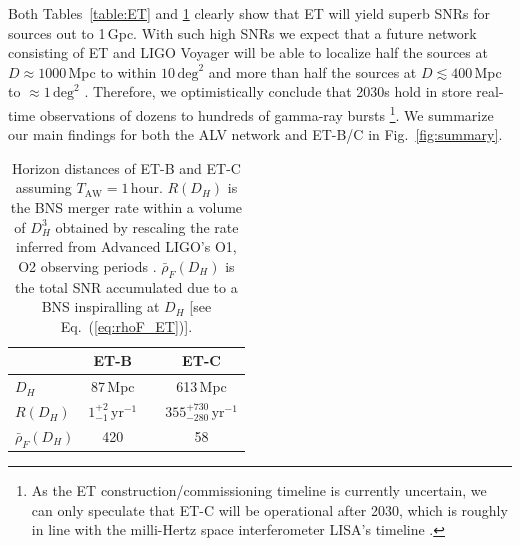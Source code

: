 \documentclass[prd,amsmath,amssymb,aps,floats,amsfonts,notitlepage,superscriptaddress,eqsecnum,nofootinbib,10pt]{revtex4-1}
\newcommand\T{\rule{0pt}{2.6ex}}       %
\newcommand\B{\rule[-1.2ex]{0pt}{0pt}} %
\begin{document}
Both Tables~\ref{table:ET} and \ref{table:horizon} clearly show that ET will yield superb SNRs for sources out to 1\,Gpc. 
With such high SNRs we expect that a future network consisting of ET and LIGO Voyager will be able to localize half the sources 
at $D\approx 1000\,$Mpc to within $ 10\,\text{deg}^2$ and more than half the sources at $D\lesssim 400\,$Mpc to $\approx 1\,\text{deg}^2$ \cite{Mills:2017urp}.
Therefore, we optimistically conclude that 2030s hold in store real-time observations of dozens to hundreds of gamma-ray bursts
\footnote{As the ET construction/commissioning timeline is currently uncertain, we can only speculate that ET-C will be operational after 2030,
which is roughly in line with the milli-Hertz space interferometer LISA's timeline \cite{Audley:2017drz}.}.
%
We summarize our main findings for both the ALV network and ET-B/C in Fig.~\ref{fig:summary}.
%
%
%
\begin{table}[h]
\centering
\begin{tabular}{l|ccc}
\hline
 & ET-B & & ET-C\T\B\\
\hline
  $D_H $& 87\,Mpc& &{613\,Mpc}\T\\
  $R(D_H) $& $1^{+2}_{-1}\,\text{yr}^{-1}$&\hspace{5mm} &{$355^{+730}_{-280}\,\text{yr}^{-1}$}\T\\
  $\bar\rho_F(D_H)$ & 420 &&{58}\T\B\\
\hline
\end{tabular}
\caption{Horizon distances of ET-B and ET-C assuming $T_\text{AW} =1\,$hour. $R(D_H)$ is the BNS merger rate within a volume of $D_H^3$
obtained by rescaling the rate inferred from Advanced LIGO's O1, O2 observing periods \cite{GW170817}. $\bar\rho_F(D_H)$ is the total SNR accumulated due to a BNS inspiralling at $D_H$ [see Eq.~(\ref{eq:rhoF_ET})].}\label{table:horizon}
\end{table}
%
%
%
\end{document}
